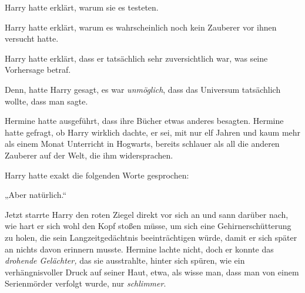 Harry hatte erklärt, warum sie es testeten.

Harry hatte erklärt, warum es wahrscheinlich noch kein Zauberer vor ihnen versucht hatte.

Harry hatte erklärt, dass er tatsächlich sehr zuversichtlich war, was seine Vorhersage betraf.

Denn, hatte Harry gesagt, es war \emph{unmöglich}, dass das Universum tatsächlich wollte, dass man  sagte.

Hermine hatte ausgeführt, dass ihre Bücher etwas anderes besagten. Hermine hatte gefragt, ob Harry wirklich dachte, er sei, mit nur elf Jahren und kaum mehr als einem Monat Unterricht in Hogwarts, bereits schlauer als all die anderen Zauberer auf der Welt, die ihm widersprachen.

Harry hatte exakt die folgenden Worte gesprochen:

„Aber natürlich.“

Jetzt starrte Harry den roten Ziegel direkt vor sich an und sann darüber nach, wie hart er sich wohl den Kopf stoßen müsse, um sich eine Gehirnerschütterung zu holen, die sein Langzeitgedächtnis beeinträchtigen würde, damit er sich später an nichts davon erinnern musste. Hermine lachte nicht, doch er konnte das \emph{drohende Gelächter,} das sie ausstrahlte, hinter sich spüren, wie ein verhängnisvoller Druck auf seiner Haut, etwa, als wisse man, dass man von einem Serienmörder verfolgt wurde, nur \emph{schlimmer}.

